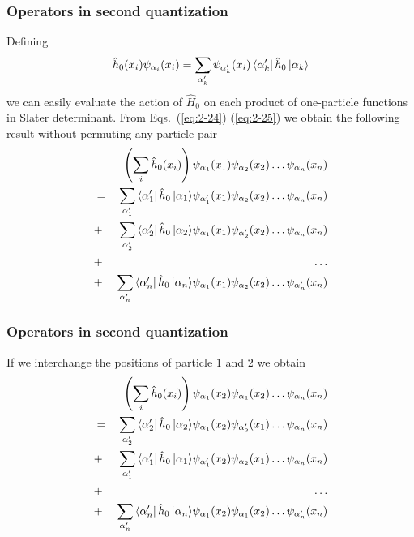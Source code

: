 \frame
{
  \frametitle{Operators in second quantization}
\begin{small}
{\scriptsize
Defining
\begin{equation}
	\hat{h}_0(x_i) \psi_{\alpha_i}(x_i) = \sum_{\alpha_k'} \psi_{\alpha_k'}(x_i) \element{\alpha_k'}{\hat{h}_0}{\alpha_k} \label{eq:2-25}
\end{equation}
we can easily  evaluate the action of $\hat{H}_0$ on each product of one-particle functions in Slater determinant.
From Eqs.~(\ref{eq:2-24}) 
(\ref{eq:2-25})  we obtain the following result without  permuting any particle pair 
\begin{eqnarray}
	&& \left( \sum_i \hat{h}_0(x_i) \right) \psi_{\alpha_1}(x_1)\psi_{\alpha_2}(x_2) \dots \psi_{\alpha_n}(x_n) \nonumber \\
	& =&\sum_{\alpha_1'} \element{\alpha_1'}{\hat{h}_0}{\alpha_1} 
		\psi_{\alpha_1'}(x_1)\psi_{\alpha_2}(x_2) \dots \psi_{\alpha_n}(x_n) \nonumber \\
	&+&\sum_{\alpha_2'} \element{\alpha_2'}{\hat{h}_0}{\alpha_2} 
		\psi_{\alpha_1}(x_1)\psi_{\alpha_2'}(x_2) \dots \psi_{\alpha_n}(x_n) \nonumber \\
	&+& \dots \nonumber \\
	&+&\sum_{\alpha_n'} \element{\alpha_n'}{\hat{h}_0}{\alpha_n} 
		\psi_{\alpha_1}(x_1)\psi_{\alpha_2}(x_2) \dots \psi_{\alpha_n'}(x_n) \label{eq:2-26}
\end{eqnarray}
}
\end{small}
}


\frame
{
  \frametitle{Operators in second quantization}
\begin{small}
{\scriptsize
If we interchange the positions of particle $1$ and $2$  we obtain
\begin{eqnarray}
	&& \left( \sum_i \hat{h}_0(x_i) \right) \psi_{\alpha_1}(x_2)\psi_{\alpha_1}(x_2) \dots \psi_{\alpha_n}(x_n) \nonumber \\
	& =&\sum_{\alpha_2'} \element{\alpha_2'}{\hat{h}_0}{\alpha_2} 
		\psi_{\alpha_1}(x_2)\psi_{\alpha_2'}(x_1) \dots \psi_{\alpha_n}(x_n) \nonumber \\
	&+&\sum_{\alpha_1'} \element{\alpha_1'}{\hat{h}_0}{\alpha_1} 
		\psi_{\alpha_1'}(x_2)\psi_{\alpha_2}(x_1) \dots \psi_{\alpha_n}(x_n) \nonumber \\
	&+& \dots \nonumber \\
	&+&\sum_{\alpha_n'} \element{\alpha_n'}{\hat{h}_0}{\alpha_n} 
		\psi_{\alpha_1}(x_2)\psi_{\alpha_1}(x_2) \dots \psi_{\alpha_n'}(x_n) \label{eq:2-27}
\end{eqnarray}
}
\end{small}
}


